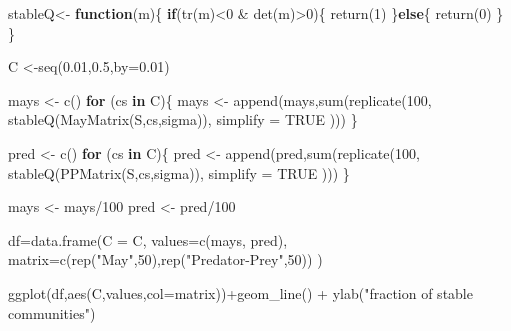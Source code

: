 \documentclass[
]{article}
\newenvironment{Shaded}{\begin{snugshade}}{\end{snugshade}}
\newcommand{\AttributeTok}[1]{\textcolor[rgb]{0.77,0.63,0.00}{#1}}
\newcommand{\ConstantTok}[1]{\textcolor[rgb]{0.00,0.00,0.00}{#1}}
\newcommand{\ControlFlowTok}[1]{\textcolor[rgb]{0.13,0.29,0.53}{\textbf{#1}}}
\newcommand{\DecValTok}[1]{\textcolor[rgb]{0.00,0.00,0.81}{#1}}
\newcommand{\FloatTok}[1]{\textcolor[rgb]{0.00,0.00,0.81}{#1}}
\newcommand{\FunctionTok}[1]{\textcolor[rgb]{0.00,0.00,0.00}{#1}}
\newcommand{\NormalTok}[1]{#1}
\newcommand{\OtherTok}[1]{\textcolor[rgb]{0.56,0.35,0.01}{#1}}
\newcommand{\SpecialCharTok}[1]{\textcolor[rgb]{0.00,0.00,0.00}{#1}}
\newcommand{\StringTok}[1]{\textcolor[rgb]{0.31,0.60,0.02}{#1}}
\begin{document}
\begin{Shaded}
\begin{Highlighting}[]
\NormalTok{stableQ}\OtherTok{\textless{}{-}} \ControlFlowTok{function}\NormalTok{(m)\{}
  \ControlFlowTok{if}\NormalTok{(}\FunctionTok{tr}\NormalTok{(m)}\SpecialCharTok{\textless{}}\DecValTok{0} \SpecialCharTok{\&} \FunctionTok{det}\NormalTok{(m)}\SpecialCharTok{\textgreater{}}\DecValTok{0}\NormalTok{)\{}
    \FunctionTok{return}\NormalTok{(}\DecValTok{1}\NormalTok{)}
\NormalTok{  \}}\ControlFlowTok{else}\NormalTok{\{}
    \FunctionTok{return}\NormalTok{(}\DecValTok{0}\NormalTok{)}
\NormalTok{  \}}
\NormalTok{\}}


\NormalTok{C }\OtherTok{\textless{}{-}}\FunctionTok{seq}\NormalTok{(}\FloatTok{0.01}\NormalTok{,}\FloatTok{0.5}\NormalTok{,}\AttributeTok{by=}\FloatTok{0.01}\NormalTok{)}

\NormalTok{mays }\OtherTok{\textless{}{-}} \FunctionTok{c}\NormalTok{()}
\ControlFlowTok{for}\NormalTok{ (cs }\ControlFlowTok{in}\NormalTok{ C)\{}
\NormalTok{  mays }\OtherTok{\textless{}{-}} \FunctionTok{append}\NormalTok{(mays,}\FunctionTok{sum}\NormalTok{(}\FunctionTok{replicate}\NormalTok{(}\DecValTok{100}\NormalTok{, }\FunctionTok{stableQ}\NormalTok{(}\FunctionTok{MayMatrix}\NormalTok{(S,cs,sigma)), }\AttributeTok{simplify =} \ConstantTok{TRUE}\NormalTok{ )))}
\NormalTok{\}}
     
\NormalTok{pred }\OtherTok{\textless{}{-}} \FunctionTok{c}\NormalTok{()}
\ControlFlowTok{for}\NormalTok{ (cs }\ControlFlowTok{in}\NormalTok{ C)\{}
\NormalTok{  pred }\OtherTok{\textless{}{-}} \FunctionTok{append}\NormalTok{(pred,}\FunctionTok{sum}\NormalTok{(}\FunctionTok{replicate}\NormalTok{(}\DecValTok{100}\NormalTok{, }\FunctionTok{stableQ}\NormalTok{(}\FunctionTok{PPMatrix}\NormalTok{(S,cs,sigma)), }\AttributeTok{simplify =} \ConstantTok{TRUE}\NormalTok{ )))}
\NormalTok{\}}

\NormalTok{mays }\OtherTok{\textless{}{-}}\NormalTok{ mays}\SpecialCharTok{/}\DecValTok{100}
\NormalTok{pred }\OtherTok{\textless{}{-}}\NormalTok{ pred}\SpecialCharTok{/}\DecValTok{100}


\NormalTok{df}\OtherTok{=}\FunctionTok{data.frame}\NormalTok{(}\AttributeTok{C =}\NormalTok{ C,}
              \AttributeTok{values=}\FunctionTok{c}\NormalTok{(mays, pred),}
              \AttributeTok{matrix=}\FunctionTok{c}\NormalTok{(}\FunctionTok{rep}\NormalTok{(}\StringTok{"May"}\NormalTok{,}\DecValTok{50}\NormalTok{),}\FunctionTok{rep}\NormalTok{(}\StringTok{"Predator{-}Prey"}\NormalTok{,}\DecValTok{50}\NormalTok{))}
\NormalTok{)}


\FunctionTok{ggplot}\NormalTok{(df,}\FunctionTok{aes}\NormalTok{(C,values,}\AttributeTok{col=}\NormalTok{matrix))}\SpecialCharTok{+}\FunctionTok{geom\_line}\NormalTok{() }\SpecialCharTok{+}
  \FunctionTok{ylab}\NormalTok{(}\StringTok{"fraction of stable communities"}\NormalTok{)}
\end{Highlighting}
\end{Shaded}
\end{document}
